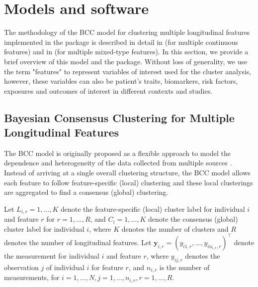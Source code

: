 \section{Models and software} \label{sec:models}
The methodology of the BCC model for clustering multiple longitudinal features implemented in the  package is described in detail in \citet{Lu2022} (for multiple continuous features) and in  \citet{Tan2022a} (for multiple mixed-type features). In this section, we provide a brief overview of this model and the  package. Without loss of generality, we use the term "features" to represent variables of interest used for the cluster analysis, however, these variables can also be patient’s traits, biomarkers, risk factors, exposures and outcomes of interest in different contexts and studies.

\subsection{Bayesian Consensus Clustering for Multiple Longitudinal Features}
The BCC model is originally proposed as a flexible approach to model the dependence and heterogeneity of the data collected from multiple sources \citep{Lock2013}. Instead of arriving at a single overall clustering structure, the BCC model allows each feature to follow feature-specific (local) clustering and these local clusterings are aggregated to find a consensus (global) clustering.

Let $L_{i,r} = 1,...,K$ denote the feature-specific (local) cluster label for individual $i$ and feature $r$ for $r=1,...,R$, and $C_i = 1,...,K$ denote the consensus (global) cluster label for individual $i$, where $K$ denotes the number of clusters and $R$ denotes the number of longitudinal features.  Let $\boldsymbol{y}_{i,r} = (y_{i1,r}, ..., y_{in_{i,r},r})^\top$ denote the measurement for individual $i$ and feature $r$, where  $y_{ij,r}$ denotes the observation $j$ of individual $i$ for feature $r$, and $n_{i,r}$ is the number of measurements, for $i=1,...,N, j=1,...,n_{i,r}, r=1,...,R$.

